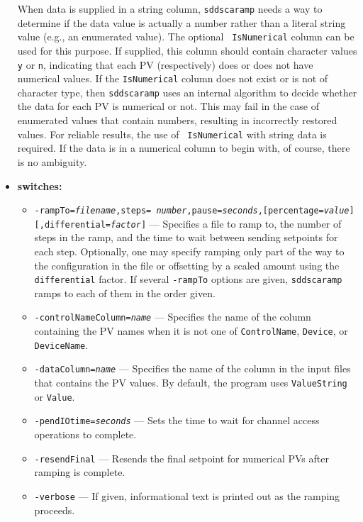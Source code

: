 \begin{itemize}
When data is supplied in a string column, {\tt sddscaramp} needs a way
to determine if the data value is actually a number rather than a
literal string value (e.g., an enumerated value).  The optional {\tt
IsNumerical} column can be used for this purpose.  If supplied, this
column should contain character values {\tt y} or {\tt n}, indicating
that each PV (respectively) does or does not have numerical values.
If the {\tt IsNumerical} column does not exist or is not of character
type, then {\tt sddscaramp} uses an internal algorithm to decide
whether the data for each PV is numerical or not.  This may fail in
the case of enumerated values that contain numbers, resulting in
incorrectly restored values.  For reliable results, the use of {\tt
IsNumerical} with string data is required.  If the data is in a
numerical column to begin with, of course, there is no ambiguity.

%
\item {\bf switches:}
%
%
    \begin{itemize}
        \item {\tt -rampTo={\em filename},steps={\em
        number},pause={\em seconds},[percentage={\em value}][,differential={\em factor}]} ---
        Specifies a file to ramp to, the number of steps in the ramp,
        and the time to wait between sending setpoints for each step.
        Optionally, one may specify ramping only part of the way to
        the configuration in the file or offsetting by a scaled
        amount using the {\tt differential} factor.  If several
        {\tt -rampTo} options are given, {\tt sddscaramp} ramps to each
        of them in the order given.
        \item {\tt -controlNameColumn={\em name}} --- Specifies the
        name of the column containing the PV names when it is not
        one of {\tt ControlName}, {\tt Device}, or {\tt DeviceName}.
        \item {\tt -dataColumn={\em name}} --- Specifies the name of
        the column in the input files that contains the PV values.
        By default, the program uses {\tt ValueString} or {\tt Value}.
        \item {\tt -pendIOtime={\em seconds}} --- Sets the time to
        wait for channel access operations to complete.
        \item {\tt -resendFinal} --- Resends the final setpoint for
        numerical PVs after ramping is complete.
        \item {\tt -verbose} --- If given, informational text is
        printed out as the ramping proceeds.
      \end{itemize}


\end{itemize}

